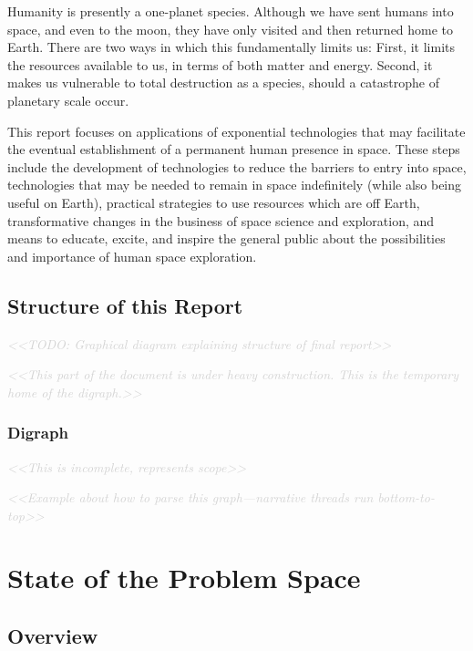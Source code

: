 \documentclass[letter,11pt]{article}
\newcommand{\todo}[1]{\textcolor{lightgray}{\textit{<<#1>>}}}
\begin{document}
Humanity is presently a one-planet species. Although we have sent
humans into space, and even to the moon, they have only visited and
then returned home to Earth. There are two ways in which this
fundamentally limits us: First, it limits the resources available to
us, in terms of both matter and energy. Second, it makes us vulnerable
to total destruction as a species, should a catastrophe of planetary
scale occur.

This report focuses on applications of exponential technologies that may
facilitate the eventual establishment of a permanent human presence in space.
These steps include the development of technologies to reduce the barriers to
entry into space, technologies that may be needed to remain in space
indefinitely (while also being useful on Earth), practical strategies to use
resources which are off Earth, transformative changes in the business of space
science and exploration, and means to educate, excite, and inspire the general
public about the possibilities and importance of human space exploration.

\subsection{Structure of this Report}

\todo{TODO: Graphical diagram explaining structure of final report}

\todo{This part of the document is under heavy construction. This is the temporary home of the digraph.}

\subsubsection{Digraph}

\todo{This is incomplete, represents scope}

\todo{Example about how to parse this graph---narrative threads run bottom-to-top}



\section{State of the Problem Space}

\subsection{Overview}
\end{document}
